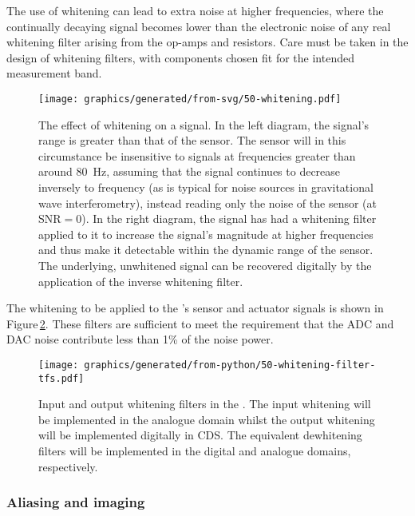 The use of whitening can lead to extra noise at higher frequencies, where the continually decaying signal becomes lower than the electronic noise of any real whitening filter arising from the op-amps and resistors. Care must be taken in the design of whitening filters, with components chosen fit for the intended measurement band.

\begin{figure}
  \centering
  \texttt{[image: graphics/generated/from-svg/50-whitening.pdf]}
  \caption[The effect of whitening on a signal]{\label{fig:whitening}The effect of whitening on a signal. In the left diagram, the signal's range is greater than that of the sensor. The sensor will in this circumstance be insensitive to signals at frequencies greater than around \SI{80}{\hertz}, assuming that the signal continues to decrease inversely to frequency (as is typical for noise sources in gravitational wave interferometry), instead reading only the noise of the sensor (at $\text{SNR} = 0$). In the right diagram, the signal has had a whitening filter applied to it to increase the signal's magnitude at higher frequencies and thus make it detectable within the dynamic range of the sensor. The underlying, unwhitened signal can be recovered digitally by the application of the inverse whitening filter.}
\end{figure}

The whitening to be applied to the \SSMEXPT{}'s sensor and actuator signals is shown in Figure\,\ref{fig:whitening-tfs}. These filters are sufficient to meet the requirement that the \gls{ADC} and \gls{DAC} noise contribute less than 1\% of the noise power.

\begin{figure}
  \centering
  \texttt{[image: graphics/generated/from-python/50-whitening-filter-tfs.pdf]}
  \caption[Input and output whitening filters in the \SSMEXPT{}]{\label{fig:whitening-tfs}Input and output whitening filters in the \SSMEXPT{}. The input whitening will be implemented in the analogue domain whilst the output whitening will be implemented digitally in CDS. The equivalent dewhitening filters will be implemented in the digital and analogue domains, respectively.}
\end{figure}

\subsubsection{Aliasing and imaging}

